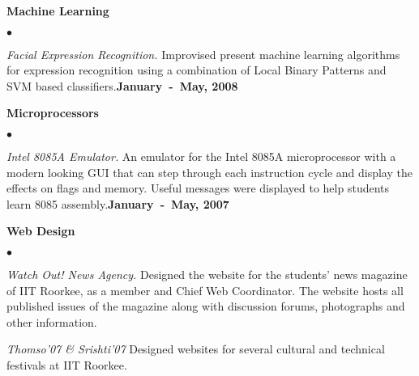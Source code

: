 \documentclass[margin,line]{res}
\newenvironment{list2}{
  \begin{list}{$\bullet$}{%
      \setlength{\itemsep}{0in}
      \setlength{\parsep}{0in} \setlength{\parskip}{0in}
      \setlength{\topsep}{0in} \setlength{\partopsep}{0in} 
      \setlength{\leftmargin}{0.2in}}}{\end{list}}
\begin{document}
\begin{resume}
{\bf Machine Learning}
\begin{list2}
\item {\em Facial Expression Recognition.} Improvised present machine learning algorithms for expression recognition using a combination of Local Binary Patterns and SVM based classifiers.\hfill {\bf January~-~May, 2008}
\end{list2}

{\bf Microprocessors}
\begin{list2}
\item {\em Intel 8085A Emulator.} An emulator for the Intel 8085A microprocessor with a modern looking GUI that can step through each instruction cycle and display the effects on flags and memory. Useful messages were displayed to help students learn 8085 assembly.\hfill {\bf January~-~May, 2007}
\end{list2}

{\bf Web Design}
\begin{list2}
\item {\em Watch Out! News Agency.} Designed the website for the students' news magazine of IIT Roorkee, as a member and Chief Web Coordinator. The website hosts all published issues of the magazine along with discussion forums, photographs and other information.
\item {\em Thomso'07 \& Srishti'07} Designed websites for several cultural and technical festivals at IIT Roorkee.
\end{list2}


\end{resume}
\end{document}

